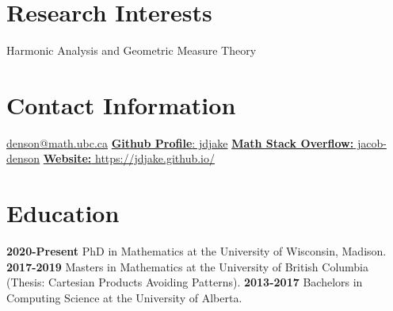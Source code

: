 \documentclass[a4paper]{cv-friggeri}
\begin{document}


\begin{aside} %
\section{Research Interests}
Harmonic Analysis and Geometric Measure Theory
~
\section{Contact Information}
\href{mailto:denson@math.ubc.ca}{denson@math.ubc.ca}
\href{https://github.com/jdjake}{{\bf Github Profile}: jdjake}
\href{https://math.stackexchange.com/users/120724/jacob-denson}{{\bf Math Stack Overflow:} jacob-denson}
\href{https://jdjake.github.io/}{{\bf Website:} https://jdjake.github.io/}
~
\section{Education}
{\bf 2020-Present}
PhD in Mathematics at the University of Wisconsin, Madison.
{\bf 2017-2019}
Masters in Mathematics at the University of British Columbia (Thesis: Cartesian Products Avoiding Patterns).
{\bf 2013-2017}
Bachelors in Computing Science at the University of Alberta.
\end{aside}
\end{document}
